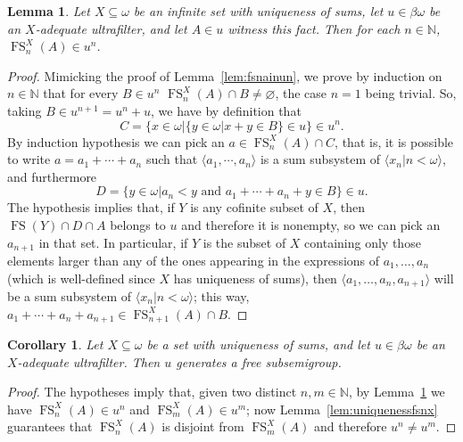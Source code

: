 \documentclass[10pt]{amsart}
\DeclareMathOperator{\fs}{FS}
\newtheorem{lemma}[theorem]{Lemma}
\newtheorem{corollary}[theorem]{Corollary}
\theoremstyle{definition}
\theoremstyle{remark}
\begin{document}
\begin{lemma}\label{lem:fsnx}
    Let $X\subseteq\omega$ be an infinite set with uniqueness of sums, let $u\in\beta\omega$ be an $X$-adequate ultrafilter, and let $A\in u$ witness this fact. Then for each $n\in\mathbb N$, $\fs_n^X(A)\in u^n$.
\end{lemma}

\begin{proof}
    Mimicking the proof of Lemma~\ref{lem:fsnainun}, we prove by induction on $n\in\mathbb N$ that for every $B\in u^n$ $\fs_n^X(A)\cap B\neq\varnothing$, the case $n=1$ being trivial. So, taking $B\in u^{n+1}=u^n+u$, we have by definition that
        \begin{equation*}
        C=\{x\in\omega\big|\{y\in\omega\big|x+y\in B\}\in u\}\in u^n.
    \end{equation*}
By induction hypothesis we can pick an $a\in\fs_n^X(A)\cap C$, that is, it is possible to write $a=a_1+\cdots+a_n$ such that $\langle a_1,\cdots,a_n\rangle$ is a sum subsystem of $\langle x_n\big|n<\omega\rangle$, and furthermore
    \begin{equation*}
        D=\{y\in\omega\big|a_n<y\text{ and }a_1+\cdots+a_n+y\in B\}\in u.
    \end{equation*}
The hypothesis implies that, if $Y$ is any cofinite subset of $X$, then $\fs(Y)\cap D\cap A$ belongs to $u$ and therefore it is nonempty, so we can pick an $a_{n+1}$ in that set. In particular, if $Y$ is the subset of $X$ containing only those elements larger than any of the ones appearing in the expressions of  $a_1,\ldots,a_n$ (which is well-defined since $X$ has uniqueness of sums), then $\langle a_1,\ldots,a_n,a_{n+1}\rangle$ will be a sum subsystem of $\langle x_n\big|n<\omega\rangle$; this way, $a_1+\cdots+a_n+a_{n+1}\in\fs_{n+1}^X(A)\cap B$.
\end{proof}

\begin{corollary}\label{prop:qpuntonoidem}
    Let $X\subseteq\omega$ be a set with uniqueness of sums, and let $u\in\beta\omega$ be an $X$-adequate ultrafilter. Then $u$ generates a free subsemigroup.
\end{corollary}

\begin{proof}
The hypotheses imply that, given two distinct $n,m\in\mathbb N$, by Lemma~\ref{lem:fsnx} we have $\fs_n^X(A)\in u^n$ and $\fs_m^X(A)\in u^m$; now Lemma~\ref{lem:uniquenessfsnx} guarantees that $\fs_n^X(A)$ is disjoint from $\fs_m^X(A)$ and therefore $u^n\neq u^m$.
\end{proof}
\end{document}
